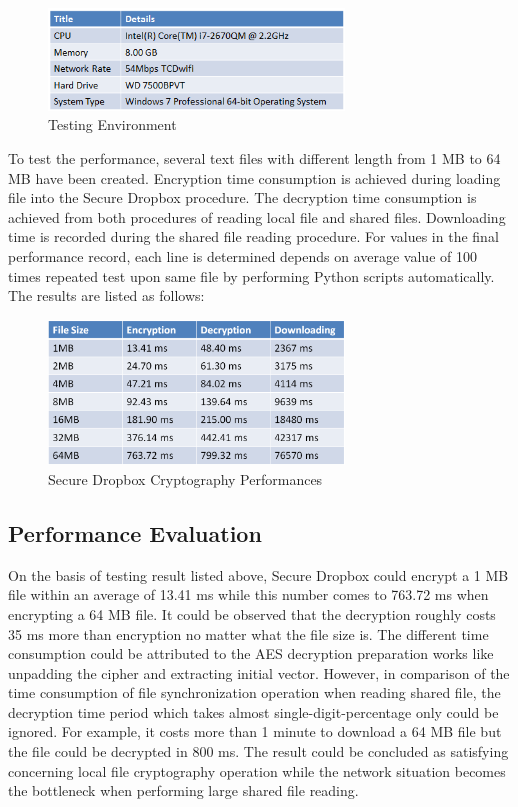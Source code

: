 \begin{figure}[h]
        \centering
        \includegraphics[width=0.7\textwidth]{figures/Testing_Environment.png}
        \caption[Testing Environment] {Testing Environment}
\end{figure}

To test the performance, several text files with different length from 1 MB to 64 MB have been created. Encryption time consumption is achieved during loading file into the Secure Dropbox procedure. The decryption time consumption is achieved from both procedures of reading local file and shared files. Downloading time is recorded during the shared file reading procedure. For values in the final performance record, each line is determined depends on average value of 100 times repeated test upon same file by performing Python scripts automatically. The results are listed as follows:

\begin{figure}[h]
        \centering
        \includegraphics[width=0.7\textwidth]{figures/Secure_Dropbox_Cryptography_Performances.png}
        \caption[Secure Dropbox Cryptography Performances ] {Secure Dropbox Cryptography Performances }
\end{figure}

\subsection{Performance Evaluation}

On the basis of testing result listed above, Secure Dropbox could encrypt a 1 MB file within an average of 13.41 ms while this number comes to 763.72 ms when encrypting a 64 MB file. It could be observed that the decryption roughly costs 35 ms more than encryption no matter what the file size is. The different time consumption could be attributed to the AES decryption preparation works like unpadding the cipher and extracting initial vector. However, in comparison of the time consumption of file synchronization operation when reading shared file, the decryption time period which takes almost single-digit-percentage only could be ignored. For example, it costs more than 1 minute to download a 64 MB file but the file could be decrypted in 800 ms. The result could be concluded as satisfying concerning local file cryptography operation while the network situation becomes the bottleneck when performing large shared file reading.

